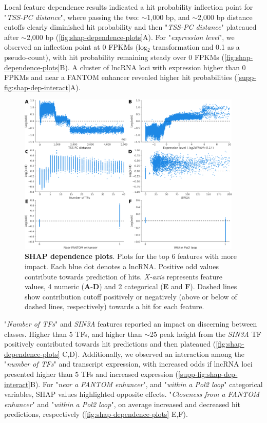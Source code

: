 Local feature dependence results indicated a hit probability inflection point for "\textit{TSS-PC distance}", where passing the two: $\sim$1,000 bp, and $\sim$2,000 bp distance cutoffs clearly diminished hit probability and then "\textit{TSS-PC distance}" plateaued after $\sim$2,000 bp (\autoref{fig:shap-dependence-plots}A). For "\textit{expression level}", we observed an inflection point at 0 FPKMs (log$_2$ transformation and 0.1 as a pseudo-count), with hit probability remaining steady over 0 FPKMs (\autoref{fig:shap-dependence-plots}B). A cluster of lncRNA loci with expression higher than 0 FPKMs and near a FANTOM enhancer revealed higher hit probabilities (\autoref{supp-fig:shap-dep-interact}A). 

\begin{figure}[!htb]
  \centering
  \includegraphics[width=0.95\textwidth]{plots/results/ml/shap.dep.v2-min.png}
  \caption[SHAP dependence plots]{\textbf{SHAP dependence plots}. Plots for the top 6 features with more impact. Each blue dot denotes a lncRNA. Positive odd values contribute towards prediction of hits. \textit{X-axis} represents feature values, 4 numeric (\textbf{A}-\textbf{D}) and 2 categorical (\textbf{E} and \textbf{F}). Dashed lines show contribution cutoff positively or negatively (above or below of dashed lines, respectively) towards a hit for each feature.}
  \label{fig:shap-dependence-plots}
\end{figure}

"\textit{Number of TFs}" and \textit{SIN3A} features reported an impact on discerning between classes. Higher than 5 TFs, and higher than $\sim$25 peak height from the \textit{SIN3A} TF positively contributed towards hit predictions and then plateaued (\autoref{fig:shap-dependence-plots} C,D). Additionally, we observed an interaction among the "\textit{number of TFs}" and transcript expression, with increased odds if lncRNA loci presented higher than 5 TFs and increased expression (\autoref{supp-fig:shap-dep-interact}B). For "\textit{near a FANTOM enhancer}", and "\textit{within a Pol2 loop}" categorical variables, SHAP values highlighted opposite effects. "\textit{Closeness from a FANTOM enhancer}" and "\textit{within a Pol2 loop}", on average increased and decreased hit predictions, respectively (\autoref{fig:shap-dependence-plots} E,F).

